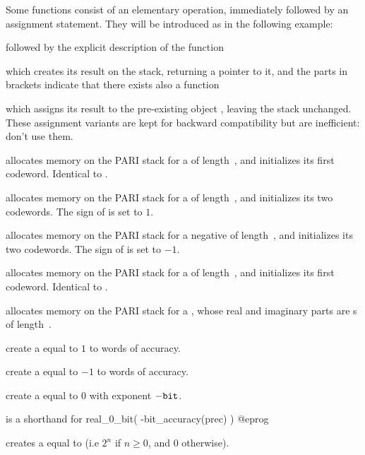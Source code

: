  Some functions consist of an elementary operation,
immediately followed by an assignment statement. They will be introduced as
in the following example:

 followed by the explicit
description of the function


\noindent which creates its result on the stack, returning a  pointer
to it, and the parts in brackets indicate that there exists also a function


\noindent which assigns its result to the pre-existing object
, leaving the stack unchanged. These assignment variants are kept for
backward compatibility but are inefficient: don't use them.


 allocates memory on the PARI stack for a 
of length~, and initializes its first codeword. Identical to
.

 allocates memory on the PARI stack for a
 of length~, and initializes its two codewords. The sign
of  is set to $1$.

 allocates memory on the PARI stack for a negative
 of length~, and initializes its two codewords. The sign
of  is set to $-1$.

 allocates memory on the PARI stack for a 
of length~, and initializes its first codeword. Identical to
.

 allocates memory on the PARI stack for a
, whose real and imaginary parts are s
of length~.

 create a  equal to $1$ to 
words of accuracy.

 create a  equal to $-1$ to 
words of accuracy.

 create a  equal to $0$ with
exponent $-{\tt bit}$.

 is a shorthand for
\bprog
  real_0_bit( -bit_accuracy(prec) )
@eprog

 creates a  equal to  (i.e
$2^n$ if $n \geq 0$, and $0$ otherwise).

